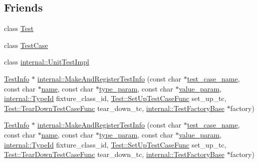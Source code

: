 \subsection*{\-Friends}
\begin{DoxyCompactItemize}
\item 
class \hyperlink{classtesting_1_1TestInfo_ab085d1bf4cff8b1045750706b11f8662}{\-Test}
\item 
class \hyperlink{classtesting_1_1TestInfo_a61fe0349d692eb6d4f5b94e35049b2e9}{\-Test\-Case}
\item 
class \hyperlink{classtesting_1_1TestInfo_aa684cc13a8f91b00c0c9ce41ec7474eb}{internal\-::\-Unit\-Test\-Impl}
\item 
\hyperlink{classtesting_1_1TestInfo}{\-Test\-Info} $\ast$ \hyperlink{classtesting_1_1TestInfo_a3e27fa5e97044d379b1e3b2a753f56f8}{internal\-::\-Make\-And\-Register\-Test\-Info} (const char $\ast$\hyperlink{classtesting_1_1TestInfo_a609cb6e3ffe274a79ede3c16fe92dc17}{test\-\_\-case\-\_\-name}, const char $\ast$\hyperlink{classtesting_1_1TestInfo_a862958aa3c2b9bf36903f1f0f2e81c54}{name}, const char $\ast$\hyperlink{classtesting_1_1TestInfo_ad596248661b2f4017c041425fa4c8b10}{type\-\_\-param}, const char $\ast$\hyperlink{classtesting_1_1TestInfo_a5751b0955ecccd6c6d9ab56d5150e60d}{value\-\_\-param}, \hyperlink{namespacetesting_1_1internal_ac8e91f0c6a06c0361dc3152ddfeb2342}{internal\-::\-Type\-Id} fixture\-\_\-class\-\_\-id, \hyperlink{classtesting_1_1Test_a2df065892efeff7ca91bb2d2fbe00975}{\-Test\-::\-Set\-Up\-Test\-Case\-Func} set\-\_\-up\-\_\-tc, \hyperlink{classtesting_1_1Test_a4ae7a4e140c70dee5c9cb82e13ae570c}{\-Test\-::\-Tear\-Down\-Test\-Case\-Func} tear\-\_\-down\-\_\-tc, \hyperlink{classtesting_1_1internal_1_1TestFactoryBase}{internal\-::\-Test\-Factory\-Base} $\ast$factory)
\item 
\hyperlink{classtesting_1_1TestInfo}{\-Test\-Info} $\ast$ \hyperlink{classtesting_1_1TestInfo_a3e27fa5e97044d379b1e3b2a753f56f8}{internal\-::\-Make\-And\-Register\-Test\-Info} (const char $\ast$\hyperlink{classtesting_1_1TestInfo_a609cb6e3ffe274a79ede3c16fe92dc17}{test\-\_\-case\-\_\-name}, const char $\ast$\hyperlink{classtesting_1_1TestInfo_a862958aa3c2b9bf36903f1f0f2e81c54}{name}, const char $\ast$\hyperlink{classtesting_1_1TestInfo_ad596248661b2f4017c041425fa4c8b10}{type\-\_\-param}, const char $\ast$\hyperlink{classtesting_1_1TestInfo_a5751b0955ecccd6c6d9ab56d5150e60d}{value\-\_\-param}, \hyperlink{namespacetesting_1_1internal_ac8e91f0c6a06c0361dc3152ddfeb2342}{internal\-::\-Type\-Id} fixture\-\_\-class\-\_\-id, \hyperlink{classtesting_1_1Test_a2df065892efeff7ca91bb2d2fbe00975}{\-Test\-::\-Set\-Up\-Test\-Case\-Func} set\-\_\-up\-\_\-tc, \hyperlink{classtesting_1_1Test_a4ae7a4e140c70dee5c9cb82e13ae570c}{\-Test\-::\-Tear\-Down\-Test\-Case\-Func} tear\-\_\-down\-\_\-tc, \hyperlink{classtesting_1_1internal_1_1TestFactoryBase}{internal\-::\-Test\-Factory\-Base} $\ast$factory)
\end{DoxyCompactItemize}


